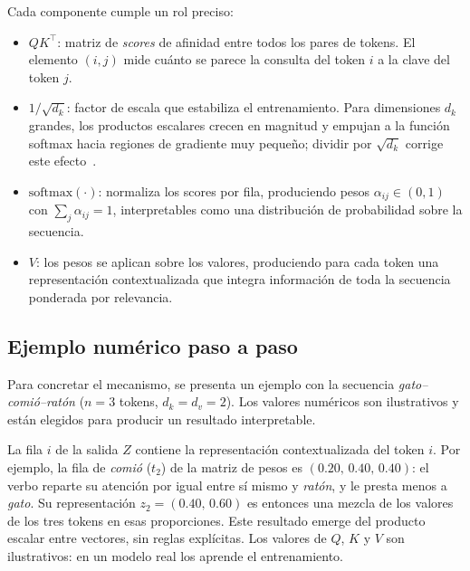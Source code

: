 Cada componente cumple un rol preciso:

\begin{itemize}
    \item $QK^{\top}$: matriz de \textit{scores} de afinidad entre todos los
    pares de tokens. El elemento $(i,j)$ mide cuánto se parece la consulta
    del token $i$ a la clave del token $j$.

    \item $1/\sqrt{d_k}$: factor de escala que estabiliza el entrenamiento.
    Para dimensiones $d_k$ grandes, los productos escalares crecen en
    magnitud y empujan a la función softmax hacia regiones de gradiente
    muy pequeño; dividir por $\sqrt{d_k}$ corrige este efecto~\cite{vaswani2017attention}.

    \item $\text{softmax}(\cdot)$: normaliza los scores por fila, produciendo
    pesos $\alpha_{ij} \in (0,1)$ con $\sum_j \alpha_{ij} = 1$, interpretables
    como una distribución de probabilidad sobre la secuencia.

    \item $V$: los pesos se aplican sobre los valores, produciendo para cada
    token una representación contextualizada que integra información de toda
    la secuencia ponderada por relevancia.
\end{itemize}

\subsection{Ejemplo numérico paso a paso}
\label{subsec:atencion_ejemplo}

Para concretar el mecanismo, se presenta un ejemplo con la secuencia
\textit{gato–comió–ratón} ($n = 3$ tokens, $d_k = d_v = 2$). Los valores
numéricos son ilustrativos y están elegidos para producir un resultado
interpretable.



La fila $i$ de la salida $Z$ contiene la representación contextualizada
del token $i$. Por ejemplo, la fila de \textit{comió} ($t_2$) de la matriz de
pesos es $(0.20,\, 0.40,\, 0.40)$: el verbo reparte su atención por igual
entre sí mismo y \textit{ratón}, y le presta menos a \textit{gato}. Su
representación $z_2 = (0.40,\, 0.60)$ es entonces una mezcla de los valores
de los tres tokens en esas proporciones. Este resultado emerge del producto
escalar entre vectores, sin reglas explícitas. Los valores de $Q$, $K$ y $V$
son ilustrativos: en un modelo real los aprende el entrenamiento.

